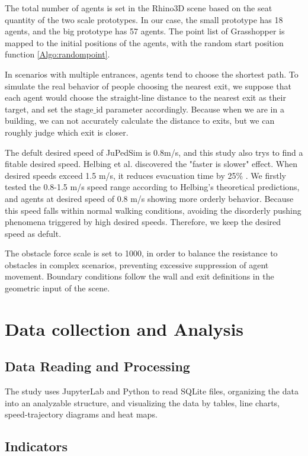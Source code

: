 The total number of agents is set in the Rhino3D scene based on the seat quantity of the two scale prototypes. In our case, the small prototype has 18 agents, and the big prototype has 57 agents. The point list of Grasshopper is mapped to the initial positions of the agents, with the random start position function \ref{Algo:randompoint}.

In scenarios with multiple entrances, agents tend to choose the shortest path. To simulate the real behavior of people choosing the nearest exit, we suppose that each agent would choose the $\text{straight-line distance}$ to the nearest exit as their target, and set the $\text{stage\_id}$ parameter accordingly. Because when we are in a building, we can not accurately calculate the distance to exits, but we can roughly judge which exit is closer.

The defult desired speed of JuPedSim is 0.8m/s, and this study also trys to find a fitable desired speed. Helbing et al. discovered the "faster is slower" effect. When desired speeds exceed 1.5 m/s, it reduces evacuation time by 25\% \cite{helbingSimulatingDynamicalFeatures2000}. We firstly tested the 0.8-1.5 m/s speed range according to Helbing's theoretical predictions, and agents at desired speed of 0.8 m/s showing more orderly behavior. Because this speed falls within normal walking conditions, avoiding the disorderly pushing phenomena triggered by high desired speeds. Therefore, we keep the desired speed as defult.

The obstacle force scale is set to 1000, in order to balance the resistance to obstacles in complex scenarios, preventing excessive suppression of agent movement. Boundary conditions follow the wall and exit definitions in the geometric input of the scene.

\section{Data collection and Analysis}

\subsection{Data Reading and Processing}
The study uses JupyterLab and Python to read SQLite files, organizing the data into an analyzable structure, and visualizing the data by tables, line charts, speed-trajectory diagrams and heat maps.

\subsection{Indicators}

